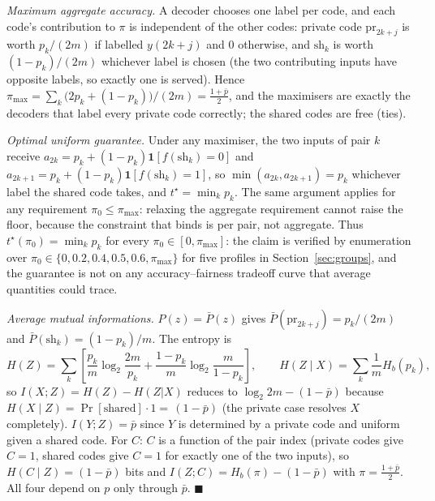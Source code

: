 \documentclass[11pt]{article}
\begin{document}
\emph{Maximum aggregate accuracy.} A decoder chooses one label per code, and each code's
contribution to $\pi$ is independent of the other codes: private code $\mathrm{pr}_{2k+j}$ is
worth $p_k/(2m)$ if labelled $y(2k+j)$ and $0$ otherwise, and $\mathrm{sh}_k$ is worth
$(1-p_k)/(2m)$ whichever label is chosen (the two contributing inputs have opposite labels,
so exactly one is served). Hence
$\pi_{\max}=\sum_k \bigl(2p_k+(1-p_k)\bigr)/(2m)=\frac{1+\bar p}{2}$,
and the maximisers are exactly the decoders that label every private code correctly; the shared
codes are free (ties).

\emph{Optimal uniform guarantee.} Under any maximiser, the two inputs of pair $k$ receive
$a_{2k}=p_k+(1-p_k)\mathbf 1[f(\mathrm{sh}_k)=0]$ and
$a_{2k+1}=p_k+(1-p_k)\mathbf 1[f(\mathrm{sh}_k)=1]$, so $\min(a_{2k},a_{2k+1})=p_k$ whichever
label the shared code takes, and $t^\star=\min_k p_k$. The same argument applies for any
requirement $\pi_0\le\pi_{\max}$: relaxing the aggregate requirement cannot raise the floor,
because the constraint that binds is per pair, not aggregate. Thus
$t^\star(\pi_0)=\min_k p_k$ for every $\pi_0\in[0,\pi_{\max}]$: the claim is verified by
enumeration over $\pi_0\in\{0,0.2,0.4,0.5,0.6,\pi_{\max}\}$ for five profiles in
Section~\ref{sec:groups}, and the guarantee is not on any accuracy--fairness tradeoff curve that
average quantities could trace.

\emph{Average mutual informations.} $P(z)=\bar P(z)$ gives
$\bar P(\mathrm{pr}_{2k+j})=p_k/(2m)$ and $\bar P(\mathrm{sh}_k)=(1-p_k)/m$. The entropy is
\begin{equation*}
H(Z)=\sum_k\left[\frac{p_k}{m}\log_2\frac{2m}{p_k}
+\frac{1-p_k}{m}\log_2\frac{m}{1-p_k}\right],
\qquad
H(Z\mid X)=\sum_k\frac{1}{m}H_b(p_k),
\end{equation*}
so $I(X;Z)=H(Z)-H(Z|X)$ reduces to
$\log_2 2m-(1-\bar p)$ because $H(X\mid Z)=\Pr[\text{shared}]\cdot 1=\,(1-\bar p)$
(the private case resolves $X$ completely). $I(Y;Z)=\bar p$ since $Y$ is determined by a
private code and uniform given a shared code. For $C$: $C$ is a function of the pair index
(private codes give $C=1$, shared codes give $C=1$ for exactly one of the two inputs), so
$H(C\mid Z)=(1-\bar p)$ bits and $I(Z;C)=H_b(\pi)-(1-\bar p)$ with $\pi=\frac{1+\bar p}{2}$.
All four depend on $p$ only through $\bar p$. \hfill$\blacksquare$
\end{document}
